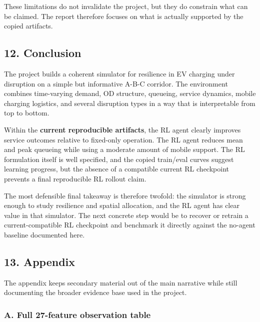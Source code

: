 \documentclass[11pt]{article}
\begin{document}
These limitations do not invalidate the project, but they do constrain
what can be claimed. The report therefore focuses on what is actually
supported by the copied artifacts.

    \subsection{12. Conclusion}\label{conclusion}

The project builds a coherent simulator for resilience in EV charging
under disruption on a simple but informative A-B-C corridor. The
environment combines time-varying demand, OD structure, queueing,
service dynamics, mobile charging logistics, and several disruption
types in a way that is interpretable from top to bottom.

Within the \textbf{current reproducible artifacts}, the RL agent clearly
improves service outcomes relative to fixed-only operation. The RL agent
reduces mean and peak queueing while using a moderate amount of mobile
support. The RL formulation itself is well specified, and the copied
train/eval curves suggest learning progress, but the absence of a
compatible current RL checkpoint prevents a final reproducible RL
rollout claim.

The most defensible final takeaway is therefore twofold: the simulator
is strong enough to study resilience and spatial allocation, and the RL
agent has clear value in that simulator. The next concrete step would be
to recover or retrain a current-compatible RL checkpoint and benchmark
it directly against the no-agent baseline documented here.

    \subsection{13. Appendix}\label{appendix}

The appendix keeps secondary material out of the main narrative while
still documenting the broader evidence base used in the project.

    \subsubsection{A. Full 27-feature observation
table}\label{a.-full-27-feature-observation-table}
\end{document}
